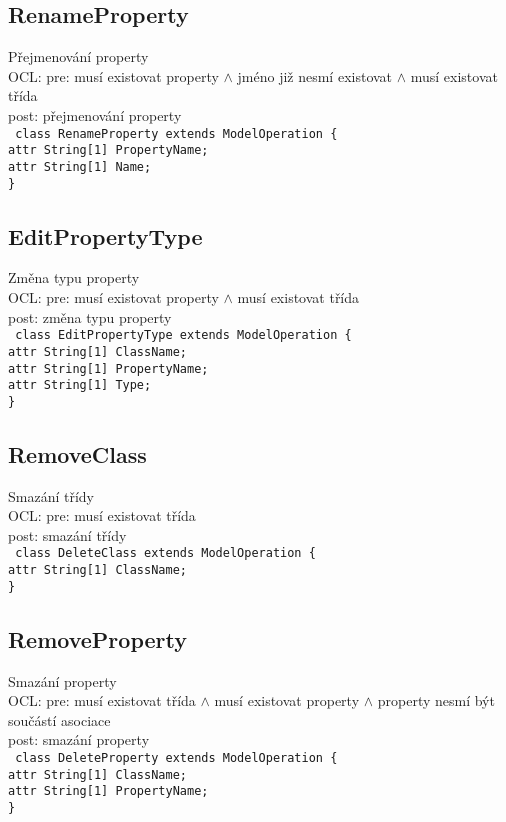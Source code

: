 \documentclass[11pt,a4paper]{article}
\begin{document}
	\subsection{RenameProperty}
	Přejmenování property \\
	OCL: pre: musí existovat property $\wedge$ jméno již nesmí existovat $\wedge$ musí existovat třída \\
	post: přejmenování property \\
	\texttt{
    class RenameProperty extends ModelOperation \{ \\
      attr String[1] PropertyName; \\
      attr String[1] Name; \\
    \}
	}
	\subsection{EditPropertyType}
	Změna typu property \\
	OCL: pre: musí existovat property $\wedge$ musí existovat třída \\
	post: změna typu property \\
	\texttt{
    class EditPropertyType extends ModelOperation \{ \\
      attr String[1] ClassName;\\
      attr String[1] PropertyName;\\
      attr String[1] Type;\\
    \}
	}
	\subsection{RemoveClass}
	Smazání třídy \\
	OCL: pre: musí existovat třída \\
	post: smazání třídy \\
	\texttt{
    class DeleteClass extends ModelOperation \{ \\
      attr String[1] ClassName;\\
    \}
	}
	\subsection{RemoveProperty}
	Smazání property \\
	OCL: pre: musí existovat třída $\wedge$ musí existovat property $\wedge$ property nesmí být součástí asociace \\
	post: smazání property \\
	\texttt{
    class DeleteProperty extends ModelOperation \{ \\
      attr String[1] ClassName; \\
      attr String[1] PropertyName; \\
    \}
	}
\end{document}
